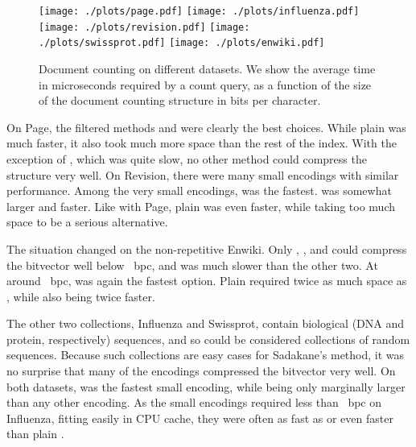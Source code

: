 \documentclass[11pt]{llncs}
\newcommand{\doccount}{\textsf{count}}
\newcommand{\Enwiki}{\textsf{Enwiki}}
\newcommand{\Page}{\textsf{Page}}
\newcommand{\Revision}{\textsf{Revision}}
\newcommand{\Influenza}{\textsf{Influenza}}
\newcommand{\Swissprot}{\textsf{Swissprot}}
\begin{document}
\begin{figure}[t]
  \texttt{[image: ./plots/page.pdf]}
\endminipage\hfill
{}
  \texttt{[image: ./plots/influenza.pdf]}
\endminipage
\vspace{1ex}
\newline
{}
  \texttt{[image: ./plots/revision.pdf]}
\endminipage\hfill
{}
  \texttt{[image: ./plots/swissprot.pdf]}
\endminipage
\vspace{1ex}
\newline
{}
  \texttt{[image: ./plots/enwiki.pdf]}
\endminipage\hfill
{}
\endminipage
\vspace{6ex}

\caption{Document counting on different datasets. We show the average time in
microseconds required by a \doccount{} query, as a function of the size of the document counting structure in bits per character.}
\label{figure:results}
\end{figure}

On \Page{}, the filtered methods \SadaPR{} and \SadaRR{} were clearly the best choices. While plain \sada{} was much faster, it also took much more space than the rest of the index. With the exception of \SadaG{}, which was quite slow, no other method could compress the structure very well. On \Revision{}, there were many small encodings with similar performance. Among the very small encodings, \sadaRS{} was the fastest. \sadaSS{} was somewhat larger and faster. Like with \Page{}, plain \sada{} was even faster, while taking too much space to be a serious alternative.

The situation changed on the non-repetitive \Enwiki. Only \sadaDS, \sadaRS,
and \SadaG{} could compress the bitvector well below ~bpc, and \SadaG{} was much slower than the other two. At around ~bpc, \sadaSS{} was again the fastest option. Plain \sada{} required twice as much space as \sadaSS, while also being twice faster.

The other two collections, \Influenza{} and \Swissprot, contain biological (DNA and protein, respectively) sequences, and so could be considered collections of random sequences. Because such collections are easy cases for Sadakane's method, it was no surprise that many of the encodings compressed the bitvector very well. On both datasets, \sadaSS{} was the fastest small encoding, while being only marginally larger than any other encoding. As the small encodings required less than ~bpc on \Influenza{}, fitting easily in CPU cache, they were often as fast as or even faster than plain \sada.
\end{document}
